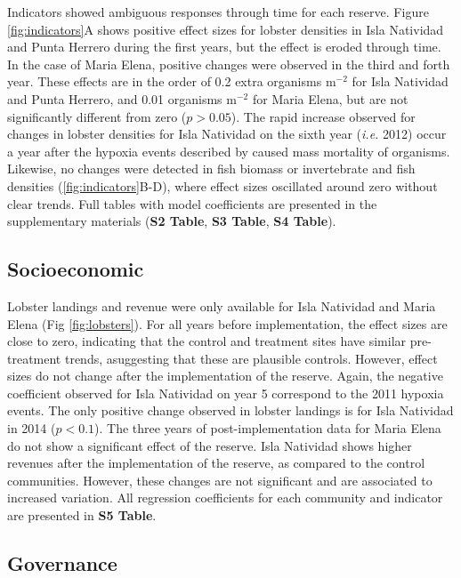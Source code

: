 \documentclass{frontiersSCNS}
\begin{document}
Indicators showed ambiguous responses through time for each reserve.
Figure \ref{fig:indicators}A shows positive effect sizes for lobster
densities in Isla Natividad and Punta Herrero during the first years,
but the effect is eroded through time. In the case of Maria Elena,
positive changes were observed in the third and forth year. These
effects are in the order of 0.2 extra organisms \(\mathrm{m}^{-2}\) for
Isla Natividad and Punta Herrero, and 0.01 organisms \(\mathrm{m}^{-2}\)
for Maria Elena, but are not significantly different from zero
(\(p > 0.05\)). The rapid increase observed for changes in lobster
densities for Isla Natividad on the sixth year (\emph{i.e.} 2012) occur
a year after the hypoxia events described by \citet{micheli_2012-EU}
caused mass mortality of organisms. Likewise, no changes were detected
in fish biomass or invertebrate and fish densities
(\ref{fig:indicators}B-D), where effect sizes oscillated around zero
without clear trends. Full tables with model coefficients are presented
in the supplementary materials (\textbf{S2 Table}, \textbf{S3 Table},
\textbf{S4 Table}).

\subsection{Socioeconomic}\label{socioeconomic}

Lobster landings and revenue were only available for Isla Natividad and
Maria Elena (Fig \ref{fig:lobsters}). For all years before
implementation, the effect sizes are close to zero, indicating that the
control and treatment sites have similar pre-treatment trends,
asuggesting that these are plausible controls. However, effect sizes do
not change after the implementation of the reserve. Again, the negative
coefficient observed for Isla Natividad on year 5 correspond to the 2011
hypoxia events. The only positive change observed in lobster landings is
for Isla Natividad in 2014 (\(p < 0.1\)). The three years of
post-implementation data for Maria Elena do not show a significant
effect of the reserve. Isla Natividad shows higher revenues after the
implementation of the reserve, as compared to the control communities.
However, these changes are not significant and are associated to
increased variation. All regression coefficients for each community and
indicator are presented in \textbf{S5 Table}.

\subsection{Governance}\label{governance}
\end{document}
